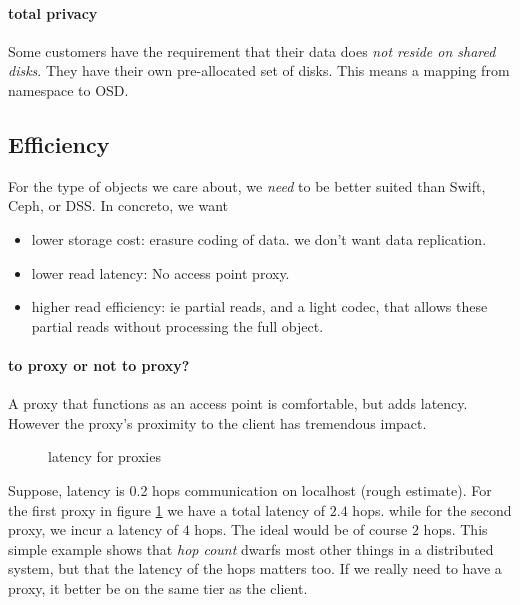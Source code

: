 \paragraph{total privacy}
Some customers have the requirement that their data does
\emph{not reside on shared disks}.
They have their own pre-allocated set of disks.
This means a mapping from namespace to OSD.

\subsection{Efficiency}
For the type of objects we care about,
we \emph{need} to be better suited than Swift, Ceph, or DSS.
In concreto, we want
\begin{itemize}
  \item{lower storage cost:}
    erasure coding of data.
    we don't want data replication.
  \item{lower read latency:} No access point proxy.
  \item{higher read efficiency:} ie partial reads, and a light codec,
  that allows these partial reads without processing the full object.
\end{itemize}

\paragraph{to proxy or not to proxy?}
A proxy that functions as an access point is comfortable, but adds latency.
However the proxy's proximity to the client has tremendous impact.
\begin{figure}[!ht]
  \caption{latency for proxies}\label{fig:proxy}
\end{figure}
Suppose, latency is 0.2 hops communication on localhost (rough estimate).
For the first proxy in figure \ref{fig:proxy} we have a total latency of $2.4$ hops.
while for the second proxy, we incur a latency of $4$ hops. The ideal would be of course $2$ hops.
This simple example shows that \emph{hop count}
dwarfs most other things in a distributed system,
but that the latency of the hops matters too.
If we really need to have a proxy, it better be on the same tier as the client.

